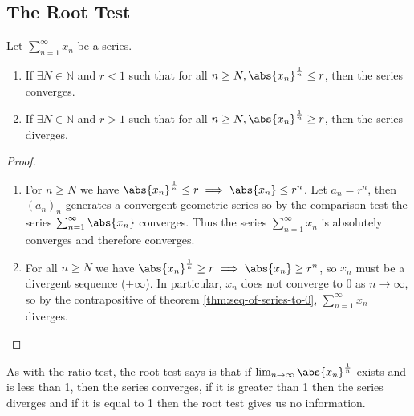 \documentclass[../real_analysis.tex]{subfiles}
\begin{document}
        \subsection{The Root Test}\label{subsec:root-test}
            \begin{theorem}\label{thm:root-test}
                Let $\sum_{n=1}^\infty x_n$ be a series.
                \begin{enumerate}[label={\upshape(\roman*)}]
                    \item If $\exists N\in\mathbb{N}$ and $r<1$ such that for all $n\geq N, \abs{x_n}^\frac{1}{n}\leq r$, then the series converges.
                    \item If $\exists N\in\mathbb{N}$ and $r>1$ such that for all $n\geq N, \abs{x_n}^\frac{1}{n}\geq r$, then the series diverges.
                \end{enumerate}
            \end{theorem}
            \begin{proof}
                \begin{enumerate}[label={\upshape(\roman*)}]
                    \item For $n\geq N$ we have $\abs{x_n}^\frac{1}{n}\leq r\implies\abs{x_n}\leq r^n$. Let $a_n=r^n$, then $(a_n)_n$ generates a convergent geometric series so by the comparison test the series $\sum_{n=1}^\infty\abs{x_n}$ converges. Thus the series $\sum_{n=1}^\infty x_n$ is absolutely converges and therefore converges.
                    \item For all $n\geq N$ we have $\abs{x_n}^\frac{1}{n}\geq r\implies\abs{x_n}\geq r^n$, so $x_n$ must be a divergent sequence ($\pm\infty$). In particular, $x_n$ does not converge to 0 as $n\to\infty$, so by the contrapositive of theorem \ref{thm:seq-of-series-to-0}, $\sum_{n=1}^\infty x_n$ diverges.
                \end{enumerate}
            \end{proof}
            As with the ratio test, the root test says is that if $\lim_{n\to\infty}\abs{x_n}^\frac{1}{n}$ exists and is less than 1, then the series converges, if it is greater than 1 then the series diverges and if it is equal to 1 then the root test gives us no information.
            
\end{document}
